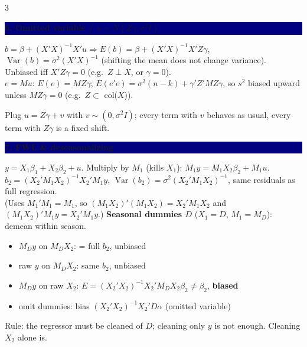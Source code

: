\documentclass[7.5pt,landscape]{extarticle}
\newcommand{\hd}[1]{\par\vspace{3pt}\noindent\colorbox{navy}{\parbox{\dimexpr\linewidth-2\fboxsep}{\color{white}\bfseries #1}}\par\vspace{1pt}}
\newcommand{\think}[1]{\par\noindent{\color{grn}\textbf{Think:}} {\color{grn}#1}\par}
\newcommand{\Var}{\operatorname{Var}}\newcommand{\Cov}{\operatorname{Cov}}\newcommand{\E}{\mathbb E}
\begin{document}
\begin{multicols}{3}
\hd{6. Omitted variable / $u\sim N(Z\gamma,\sigma^2I)$}
$b=\beta+(X'X)^{-1}X'u\Rightarrow E(b)=\beta+(X'X)^{-1}X'Z\gamma$, $\Var(b)=\sigma^2(X'X)^{-1}$ (shifting the mean does not change variance).\\
Unbiased iff $X'Z\gamma=0$ (e.g.\ $Z\perp X$, or $\gamma=0$).\\
$e=Mu$: $E(e)=MZ\gamma$; $E(e'e)=\sigma^2(n-k)+\gamma'Z'MZ\gamma$, so $s^2$ biased upward unless $MZ\gamma=0$ (e.g.\ $Z\subset$ col($X$)).
\think{Plug $u=Z\gamma+v$ with $v\sim(0,\sigma^2I)$; every term with $v$ behaves as usual, every term with $Z\gamma$ is a fixed shift.}

\hd{7. FWL \& deseasonalizing}
$y=X_1\beta_1+X_2\beta_2+u$. Multiply by $M_1$ (kills $X_1$): $M_1y=M_1X_2\beta_2+M_1u$.\\
$b_2=(X_2'M_1X_2)^{-1}X_2'M_1y$,\; $\Var(b_2)=\sigma^2(X_2'M_1X_2)^{-1}$, same residuals as full regression.\\
(Uses $M_1'M_1=M_1$, so $(M_1X_2)'(M_1X_2)=X_2'M_1X_2$ and $(M_1X_2)'M_1y=X_2'M_1y$.)
\textbf{Seasonal dummies $D$} ($X_1=D$, $M_1=M_D$): demean within season.
\begin{itemize}
\item $M_Dy$ on $M_DX_2$: = full $b_2$, unbiased
\item raw $y$ on $M_DX_2$: same $b_2$, unbiased
\item $M_Dy$ on raw $X_2$: $E=(X_2'X_2)^{-1}X_2'M_DX_2\beta_2\ne\beta_2$, \textbf{biased}
\item omit dummies: bias $(X_2'X_2)^{-1}X_2'D\alpha$ (omitted variable)
\end{itemize}
\think{Rule: the regressor must be cleaned of $D$; cleaning only $y$ is not enough. Cleaning $X_2$ alone is.}


\end{multicols}
\end{document}
